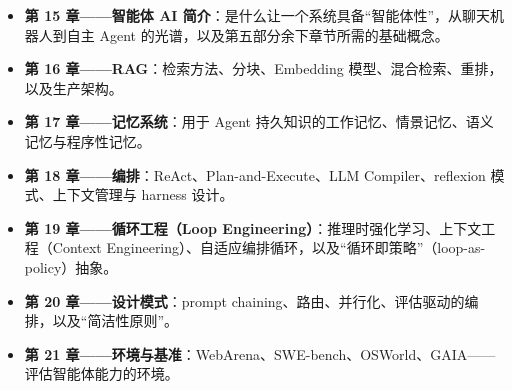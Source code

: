 \documentclass[11pt,a4paper,openany]{book}
\begin{document}
\begin{itemize}
  \item \textbf{第 15 章——智能体 AI 简介}：是什么让一个系统具备“智能体性”，从聊天机器人到自主 Agent 的光谱，以及第五部分余下章节所需的基础概念。
  \item \textbf{第 16 章——RAG}：检索方法、分块、Embedding 模型、混合检索、重排，以及生产架构。
  \item \textbf{第 17 章——记忆系统}：用于 Agent 持久知识的工作记忆、情景记忆、语义记忆与程序性记忆。
  \item \textbf{第 18 章——编排}：ReAct、Plan-and-Execute、LLM Compiler、reflexion 模式、上下文管理与 harness 设计。
  \item \textbf{第 19 章——循环工程（Loop Engineering）}：推理时强化学习、上下文工程（Context Engineering）、自适应编排循环，以及“循环即策略”（loop-as-policy）抽象。
  \item \textbf{第 20 章——设计模式}：prompt chaining、路由、并行化、评估驱动的编排，以及“简洁性原则”。
  \item \textbf{第 21 章——环境与基准}：WebArena、SWE-bench、OSWorld、GAIA——评估智能体能力的环境。

\end{itemize}
\end{document}
